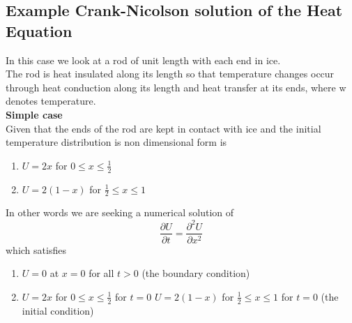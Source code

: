 \subsection{Example Crank-Nicolson solution of the Heat Equation} 
In this case we look at a rod of unit length with each end in ice.\\
The rod is heat insulated along its length so that temperature changes occur through
heat conduction along its length and heat transfer at its ends, where w denotes
temperature.\\
\textbf{Simple case}\\
Given that the ends of the rod are kept in contact with ice and the initial temperature
distribution is non dimensional form is
\begin{enumerate}
\item $U=2x$ for $0\leq x \leq \frac{1}{2}$ 
\item $U=2(1-x)$ for $\frac{1}{2}\leq x \leq 1$ 
\end{enumerate}
In other words we are seeking a numerical solution of
\[\frac{\partial U}{\partial t}=\frac{\partial^2U }{\partial x^2}\]
which satisfies
\begin{enumerate}
\item $U=0$ at $x=0$ for all $t>0$ (the boundary condition)
\item $U=2x$ for $0\leq x \leq \frac{1}{2}$ for $t=0$
$U=2(1-x)$ for $\frac{1}{2}\leq x \leq 1$ for $t=0$ (the initial condition)
\end{enumerate}
